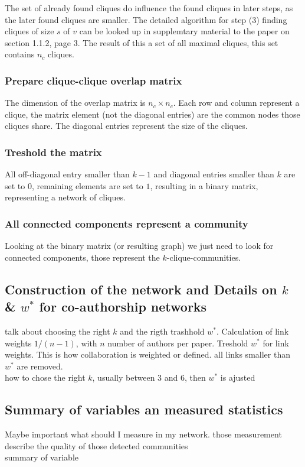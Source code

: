 \documentclass[runningheads,a4paper]{llncs}
\begin{document}
The set of already found cliques do influence the found cliques in later steps, as the later found cliques are smaller. The detailed algorithm for step (3) finding cliques of size $s$ of $v$ can be looked up in supplemtary material to the paper on section 1.1.2, page 3. The result of this a set of all maximal cliques, this set contains $n_c$ cliques.

\subsubsection{Prepare clique-clique overlap matrix}
The dimension of the overlap matrix is $n_c \times n_c$. Each row and column represent a clique, the matrix element (not the diagonal entries) are the common nodes those cliques share. The diagonal entries represent the size of the cliques.

\subsubsection{Treshold the matrix}
All off-diagonal entry smaller than $k-1$ and diagonal entries smaller than $k$ are set to $0$, remaining elements are set to $1$, resulting in a binary matrix, representing a network of cliques.
 
\subsubsection{All connected components represent a community}
Looking at the binary matrix (or resulting graph) we just need to look for connected components, those represent the $k$-clique-communities.


\subsection{Construction of the network and Details on $k$ \& $w^*$ for co-authorship networks}
\label{cpm-construction}
talk about choosing the right $k$ and the rigth trashhold $w^*$. Calculation of link weights $1/(n-1)$, with $n$ number of authors per paper. Treshold $w^*$ for link weights. This is how collaboration is weighted or defined. all links smaller than $w^*$ are removed.\\
how to chose the right $k$, usually between $3$ and $6$, then $w^*$ is ajusted\\

\subsection{Summary of variables an measured statistics}
Maybe important what should I measure in my network.
those measurement describe the quality of those detected communities\\
summary of variable\\
\end{document}
